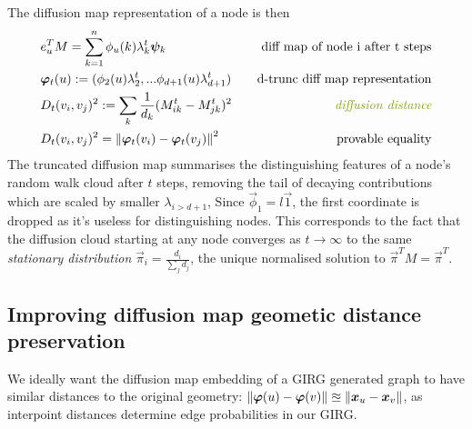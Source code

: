 The diffusion map representation of a node is then
\begin{align*}
  & e_u^T M = \sum_{k=1}^n \phi_u(k) \lambda_k^t \vec{\psi}_k \quad & \text{diff map of node i after t steps}\\
  & \vec{\varphi}_t(u) := (\phi_2(u) \lambda_2^t,... \phi_{d+1}(u) \lambda_{d+1}^t) 
  \quad & \text{d-trunc diff map representation}
  \\
  & D_t(v_i, v_j)^2 := \sum_k \frac{1}{d_k} (M^t_{ik} - M^t_{jk})^2
  \quad & \text{\textit{diffusion distance}}
  \\
  & D_t(v_i, v_j)^2 = \norm{\vec{\varphi}_t(v_i) - \vec{\varphi}_t(v_j)}^2
  \quad & \text{provable equality}
\end{align*}
%
The truncated diffusion map summarises the distinguishing features of a node's random walk cloud after $t$ steps, removing the tail of decaying contributions which are scaled by smaller $\lambda_{i > d+1}$,
Since $\vec{\phi}_1 = l \vec{1}$, the first coordinate is dropped as it's useless for distinguishing nodes. This corresponds to the fact that the diffusion cloud starting at any node converges as $t \to \infty$ to the same \textit{stationary distribution} $\vec{\pi}_i = \frac{d_i}{\sum_j d_j}$, the unique normalised solution to $\vec{\pi}^T M = \vec{\pi}^T$.

\subsection{Improving diffusion map geometic distance preservation}
\label{sec:diff_map_geometry}
We ideally want the diffusion map embedding of a GIRG generated graph to have similar distances to the original geometry: $\left\lVert \bm{\varphi}(u) - \bm{\varphi}(v)\right\rVert \approxeq \left\lVert \bm{x}_u - \bm{x}_v\right\rVert$, as interpoint distances determine edge probabilities in our GIRG.



